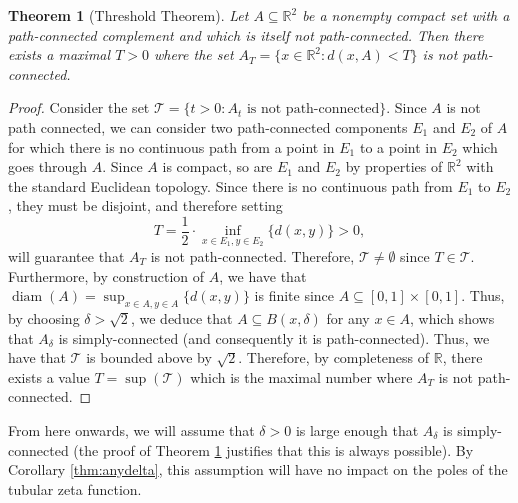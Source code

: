 \documentclass{article}
\theoremstyle{plain}
\newtheorem{theorem}{Theorem}
\numberwithin{equation}{section}
\numberwithin{table}{section}
\numberwithin{figure}{section}
\DeclareMathOperator{\diam}{diam}
\newcommand{\vaddspace}[1]{\rule{0pt}{#1pt}}
\newcommand{\newparagraph}{\vaddspace{10}}
\begin{document}
\begin{theorem}[Threshold Theorem] \label{thm:thresholdexists}
Let $A \subseteq \mathbb{R}^2$ be a nonempty compact set with a path-connected complement and which is itself not path-connected. Then there exists a maximal $T > 0$ where the set $A_T = \{x \in \mathbb{R}^2 : d(x,A) < T\}$ is not path-connected.
\end{theorem}
\begin{proof}
Consider the set $\mathscr{T} = \{t > 0 : A_t \text{ is not path-connected}\}$. Since $A$ is not path connected, we can consider two path-connected components $E_1$ and $E_2$ of $A$ for which there is no continuous path from a point in $E_1$ to a point in $E_2$ which goes through $A$. Since $A$ is compact, so are $E_1$ and $E_2$ by properties of $\mathbb{R}^2$ with the standard Euclidean topology. Since there is no continuous path from $E_1$ to $E_2$, they must be disjoint, and therefore setting
\begin{equation}
T = \frac{1}{2} \cdot \inf_{x\in E_1, y\in E_2} \{d(x,y)\} > 0,
\end{equation}
will guarantee that $A_T$ is not path-connected. Therefore, $\mathscr{T} \neq \emptyset$ since $T \in \mathscr{T}$. \\

Furthermore, by construction of $A$, we have that $\displaystyle \diam(A) = \sup_{x\in A, y \in A}\{d(x,y)\}$ is finite since $A \subseteq [0,1]\times[0,1]$. Thus, by choosing $\delta > \sqrt{2}$, we deduce that $A \subseteq B(x, \delta)$ for any $x \in A$, which shows that $A_{\delta}$ is simply-connected (and consequently it is path-connected). Thus, we have that $\mathscr{T}$ is bounded above by $\sqrt{2}$. Therefore, by completeness of $\mathbb{R}$, there exists a value $T = \sup(\mathscr{T})$ which is the maximal number where $A_T$ is not path-connected.
\end{proof}
\newparagraph

From here onwards, we will assume that $\delta > 0$ is large enough that $A_{\delta}$ is simply-connected (the proof of Theorem \ref{thm:thresholdexists} justifies that this is always possible). By Corollary \ref{thm:anydelta}, this assumption will have no impact on the poles of the tubular zeta function.
\newparagraph
\end{document}
